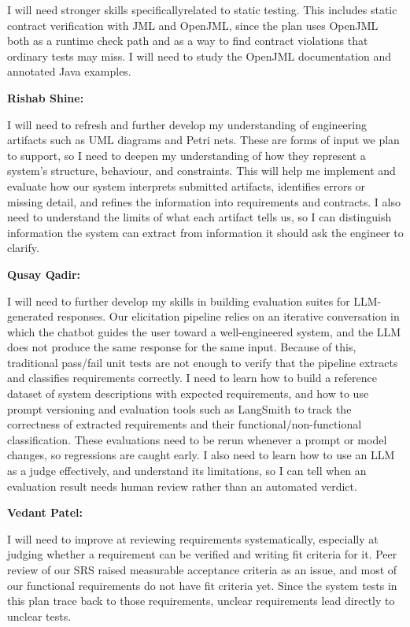 \documentclass[12pt, titlepage]{article}
\begin{document}
\begin{enumerate}
  I will need stronger skills specificallyrelated to static testing.
  This includes static contract verification with JML and OpenJML, since
  the plan uses OpenJML both as a runtime check path and as a way to find
  contract violations that ordinary tests may miss. I will need to study the
  OpenJML documentation and annotated Java examples.

  \textbf{Rishab Shine:}

  I will need to refresh and further develop my understanding of engineering
  artifacts such as UML diagrams and Petri nets. These are forms of input we
  plan to support, so I need to deepen my understanding of how they represent 
  a system's structure, behaviour, and constraints. This will help me implement 
  and evaluate how our system interprets submitted artifacts, identifies errors
  or missing detail, and refines the information into requirements and
  contracts. I also need to understand the limits of what each artifact tells
  us, so I can distinguish information the system can extract from information
  it should ask the engineer to clarify.

  \textbf{Qusay Qadir: }

  I will need to further develop my skills in building evaluation suites for LLM-generated responses. Our elicitation pipeline relies on an iterative conversation in which the chatbot guides the user toward a well-engineered system, and the LLM does not produce the same response for the same input.
  Because of this, traditional pass/fail unit tests are not enough to verify that the pipeline extracts and classifies requirements correctly. I need to learn how to build a reference dataset of system descriptions with expected requirements, and how to use prompt versioning and evaluation tools such as
  LangSmith to track the correctness of extracted requirements and their functional/non-functional classification. These evaluations need to be rerun whenever a prompt or model changes, so regressions are caught early. I also need to learn how to use an LLM as a judge effectively, and understand its
  limitations, so I can tell when an evaluation result needs human review rather than an automated verdict.


  \textbf{Vedant Patel:}

  I will need to improve at reviewing requirements systematically, especially
  at judging whether a requirement can be verified and writing fit criteria
  for it. Peer review of our SRS raised measurable acceptance criteria as an
  issue, and most of our functional requirements do not have fit criteria yet.
  Since the system tests in this plan trace back to those requirements, unclear
  requirements lead directly to unclear tests.


\end{enumerate}
\end{document}
